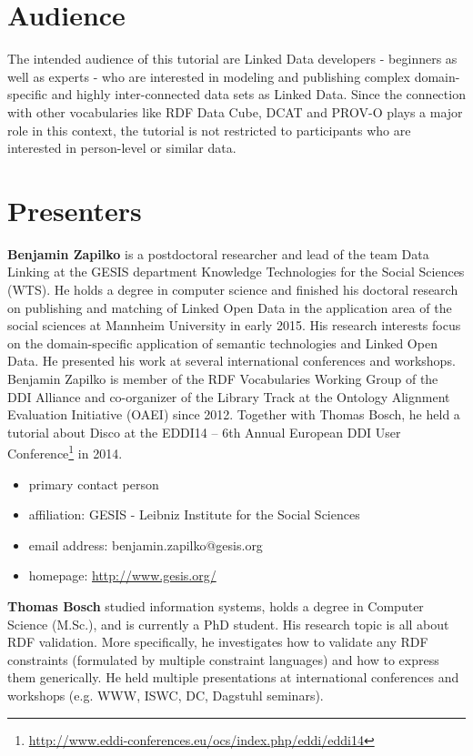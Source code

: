 \documentclass{llncs}
\begin{document}
\section{Audience}
The intended audience of this tutorial are Linked Data developers - beginners as well as experts - who are interested in modeling and publishing complex domain-specific and highly inter-connected data sets as Linked Data. Since the connection with other vocabularies like RDF Data Cube, DCAT and PROV-O plays a major role in this context, the tutorial is not restricted to participants who are interested in person-level or similar data.

\section{Presenters}


\textbf{Benjamin Zapilko} is a postdoctoral researcher and lead of the team Data Linking at the GESIS department Knowledge Technologies for the Social Sciences (WTS). He holds a degree in computer science and finished his doctoral research on publishing and matching of Linked Open Data in the application area of the social sciences at Mannheim University in early 2015. His research interests focus on the domain-specific application of semantic technologies and Linked Open Data. He presented his work at several international conferences and workshops. Benjamin Zapilko is member of the RDF Vocabularies Working Group of the DDI Alliance and co-organizer of the Library Track at the Ontology Alignment Evaluation Initiative (OAEI) since 2012. Together with Thomas Bosch, he held a tutorial about Disco at the EDDI14 – 6th Annual European DDI User Conference\footnote{\url{http://www.eddi-conferences.eu/ocs/index.php/eddi/eddi14}} in 2014.

\begin{itemize}
\item primary contact person 
 \item affiliation: GESIS - Leibniz Institute for the Social Sciences
  \item email address: benjamin.zapilko@gesis.org
	\item homepage: \url{http://www.gesis.org/}
\end{itemize}

\textbf{Thomas Bosch} studied information systems, holds a degree in Computer Science (M.Sc.), and is currently a PhD student.
His research topic is all about RDF validation.
More specifically, he investigates how to validate any RDF constraints (formulated by multiple constraint languages) and how to express them generically. 
He held multiple presentations at international conferences and workshops (e.g. WWW, ISWC, DC, Dagstuhl seminars). 
\end{document}
